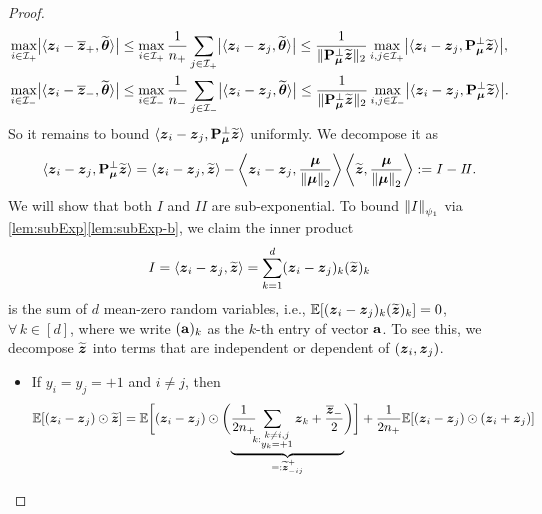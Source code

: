 \begin{proof}
\begin{equation}\label{eq:maxmax_z}
    \begin{aligned}
        \max_{i \in \mathcal{I}_+} \bigl| \< \zz_i - \bar\zz_+, \wt\vtheta \> \bigr|
        & \le \max_{i \in \mathcal{I}_+} \frac{1}{n_+} \sum_{j \in \mathcal{I}_+} \bigl| \< \zz_i - \zz_j, \wt\vtheta \> \bigr|
        \le \frac{1}{\| \bP_{\vmu}^\perp \wt\zz \|_2} \max_{i,j \in \mathcal{I}_+} \bigl| \< \zz_i - \zz_j, \bP_{\vmu}^\perp \wt\zz \>  \bigr|,  \\
        \max_{i \in \mathcal{I}_-} \bigl| \< \zz_i - \bar\zz_-, \wt\vtheta \> \bigr|
        & \le \max_{i \in \mathcal{I}_-} \frac{1}{n_-} \sum_{j \in \mathcal{I}_-} \bigl| \< \zz_i - \zz_j, \wt\vtheta \> \bigr|
        \le \frac{1}{\| \bP_{\vmu}^\perp \wt\zz \|_2} \max_{i, j \in \mathcal{I}_-} \bigl| \< \zz_i - \zz_j, \bP_{\vmu}^\perp \wt\zz \>  \bigr|.
    \end{aligned}
\end{equation}
So it remains to bound $\< \zz_i - \zz_j, \bP_{\vmu}^\perp \wt\zz \>$ uniformly. We decompose it as
\begin{equation*}
    \< \zz_i - \zz_j, \bP_{\vmu}^\perp \wt\zz \>
    = 
    \< \zz_i - \zz_j, \wt\zz \> - \left\< \zz_i - \zz_j, \frac{\vmu}{\norm{\vmu}_2} \right\>
            \left\< \wt\zz, \frac{\vmu}{\norm{\vmu}_2} \right\>
    := I -  I\!I.
\end{equation*}
We will show that both $I$ and $I\!I$ are sub-exponential. To bound $\norm{I}_{\psi_1}$ via \cref{lem:subExp}\ref{lem:subExp-b}, we claim the inner product
\begin{equation*}
    I = \< \zz_i - \zz_j, \wt\zz \> = \sum_{k=1}^d (\zz_i - \zz_j)_k (\wt\zz)_k
\end{equation*}
is the sum of $d$ mean-zero random variables, i.e., $\E[(\zz_i - \zz_j)_k (\wt\zz)_k] = 0$, $\forall\, k \in [d]$, where we write $(\ba)_k$ as the $k$-th entry of vector $\ba$. To see this, we decompose $\wt\zz$ into terms that are independent or dependent of $(\zz_i, \zz_j)$.
\begin{itemize}
    \item If $y_i = y_j = +1$ and $i \not= j$, then
    \begin{align*}
        \E[ (\zz_i - \zz_j) \odot \wt\zz ]
        & =  \E\biggl[(\zz_i - \zz_j) \odot 
        \biggl( \underbrace{  \frac1{2 n_+} \!\!\! \sum_{k: \substack{k \not= i, j \\ y_k = +1}} \zz_k + \frac{\bar\zz_-}2  }_{ =: \wt\zz_{-ij}^+ }
        \biggr)
        \biggr] 
        + \frac{1}{2 n_+} \E[ (\zz_i - \zz_j) \odot (\zz_i + \zz_j) ] \\

\end{align*}
\end{itemize}
\end{proof}
